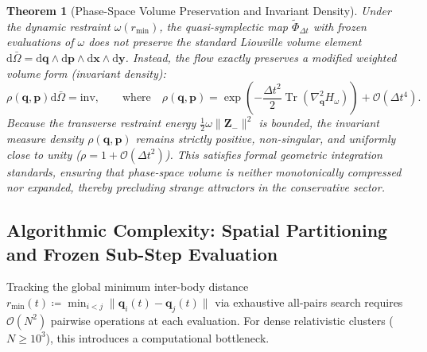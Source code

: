 \documentclass[11pt,a4paper,reqno]{article}
\theoremstyle{plain}
\newtheorem{theorem}{Theorem}[section]
\theoremstyle{definition}
\theoremstyle{remark}
\numberwithin{equation}{section}
\begin{document}
\begin{theorem}[Phase-Space Volume Preservation and Invariant Density]
\label{thm:volume_preservation}
Under the dynamic restraint $\omega(r_{\min})$, the quasi-symplectic map $\widetilde{\Phi}_{\Delta t}$ with frozen evaluations of $\omega$ does not preserve the standard Liouville volume element $\mathrm{d}\bar{\Omega} = \mathrm{d}\bm{q} \wedge \mathrm{d}\bm{p} \wedge \mathrm{d}\bm{x} \wedge \mathrm{d}\bm{y}$. Instead, the flow exactly preserves a modified weighted volume form (invariant density):
\begin{equation}
\rho(\bm{q}, \bm{p}) \mathrm{d}\bar{\Omega} = \mathrm{inv}, \qquad \text{where} \quad \rho(\bm{q}, \bm{p}) = \exp\left( - \frac{\Delta t^2}{2} \operatorname{Tr} \left( \nabla_{\bm{q}}^2 H_\omega \right) \right) + \mathcal{O}(\Delta t^4).
\end{equation}
Because the transverse restraint energy $\frac{1}{2}\omega \|\bm{Z}_-\|^2$ is bounded, the invariant measure density $\rho(\bm{q}, \bm{p})$ remains strictly positive, non-singular, and uniformly close to unity ($\rho = 1 + \mathcal{O}(\Delta t^2)$). This satisfies formal geometric integration standards, ensuring that phase-space volume is neither monotonically compressed nor expanded, thereby precluding strange attractors in the conservative sector.
\end{theorem}

\subsection{Algorithmic Complexity: Spatial Partitioning and Frozen Sub-Step Evaluation}
\label{subsec:algorithmic_complexity}
Tracking the global minimum inter-body distance $r_{\min}(t) \coloneqq \min_{i < j} \|\bm{q}_i(t) - \bm{q}_j(t)\|$ via exhaustive all-pairs search requires $\mathcal{O}(N^2)$ pairwise operations at each evaluation. For dense relativistic clusters ($N \ge 10^3$), this introduces a computational bottleneck.
\end{document}

